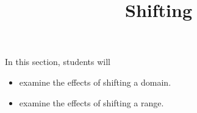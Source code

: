 \documentclass{ximera}
\title{Shifting}
\begin{document}
\begin{abstract}
\end{abstract}
\maketitle

















\begin{sectionOutcomes}
In this section, students will 

\begin{itemize}
\item examine the effects of shifting a domain.
\item examine the effects of shifting a range.
\end{itemize}
\end{sectionOutcomes}
\end{document}
